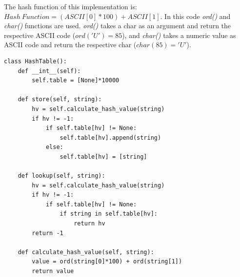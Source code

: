The hash function of this implementation is: \(Hash \ Function = (ASCII[0]*100) + ASCII[1]\). In this code \textit{ord()} and \textit{char()} functions are used. \textit{ord()} takes a char as an argument and return the respective ASCII code (\(ord('U')=85\)), and \textit{char()} takes a numeric value as ASCII code and return the respective char (\(char(85)='U'\)).
\begin{lstlisting}[firstnumber=1, caption={String key implementation.}]
class HashTable():
	def __int__(self):
		self.table = [None]*10000
	
	def store(self, string):
		hv = self.calculate_hash_value(string)
		if hv != -1:
			if self.table[hv] != None:
				self.table[hv].append(string)
			else:
				self.table[hv] = [string]
	
	def lookup(self, string):
		hv = self.calculate_hash_value(string)
		if hv != -1:
			if self.table[hv] != None:
				if string in self.table[hv]:
					return hv
		return -1
	
	def calculate_hash_value(self, string):
		value = ord(string[0]*100) + ord(string[1])
		return value
\end{lstlisting}